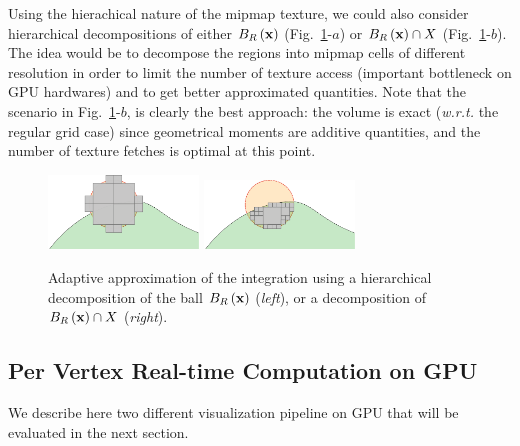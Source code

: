 \documentclass{llncs}
\newcommand{\wrt}{\emph{w.r.t.} }
\begin{document}
Using the hierachical nature of the mipmap texture, we could also
consider hierarchical decompositions of either $B_{R}\left(\mathbf{x}\right)$
(Fig.~\ref{fig:approx2}-$a$) or $B_{R}\left(\mathbf{x}\right)\cap X$
(Fig.~\ref{fig:approx2}-$b$). The idea would be to decompose the
regions into mipmap cells of different resolution in order to limit
the number of texture access (important bottleneck on GPU hardwares)
and to get better approximated quantities. Note that the scenario in
Fig.~\ref{fig:approx2}-$b$, is clearly the best approach: the
volume is exact  (\wrt the regular grid case) since geometrical moments
are additive quantities, and the number of texture fetches is  optimal
at this point.

\begin{figure}
  \vspace{-0.35cm}
  \begin{center}
    {\includegraphics[width=4cm]{figs/approx-bh}}
    {\includegraphics[width=4cm]{figs/approx-ada}}
  \end{center}
  \vspace{-0.35cm}
  \caption{Adaptive approximation of the integration using a
    hierarchical decomposition of the ball $B_{R}\left(\mathbf{x}\right)$ (\emph{left}), or a decomposition of $B_{R}\left(\mathbf{x}\right)\cap X$ (\emph{right}).}
  \label{fig:approx2}
\end{figure}

\subsection{Per Vertex Real-time Computation on GPU}
\label{sec:hierarchical}

We describe here two different visualization pipeline on GPU that will
be evaluated in the next section.
\end{document}

